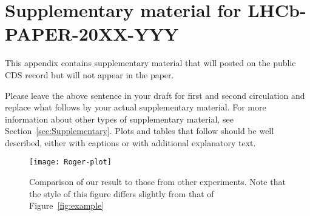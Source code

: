 \clearpage

\section{Supplementary material for LHCb-PAPER-20XX-YYY}
\label{sec:Supplementary-App}

This appendix contains supplementary material that will posted
on the public CDS record but will not appear in the paper.

Please leave the above sentence in your draft for first and 
second circulation and replace what follows by your actual supplementary material.
For more information about other types of supplementary material, see Section~\ref{sec:Supplementary}. Plots and tables that follow should be well described, either with captions or with additional explanatory text.


\begin{figure}[!htb]
  \begin{center}
    \texttt{[image: Roger-plot]}
    \vspace*{-1.0cm}
  \end{center}
  \caption{
    \small %
    Comparison of our result to those from other experiments.
    Note that the style of this figure differs slightly from that of Figure~\ref{fig:example}}
  \label{fig:roger}
\end{figure}

\clearpage
